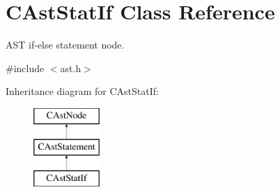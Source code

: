 \hypertarget{classCAstStatIf}{\section{C\-Ast\-Stat\-If Class Reference}
\label{classCAstStatIf}
}


A\-S\-T if-\/else statement node.  




{\ttfamily \#include $<$ast.\-h$>$}

Inheritance diagram for C\-Ast\-Stat\-If\-:\begin{figure}[H]
\begin{center}
\leavevmode
\includegraphics[height=3.000000cm]{classCAstStatIf}
\end{center}
\end{figure}
